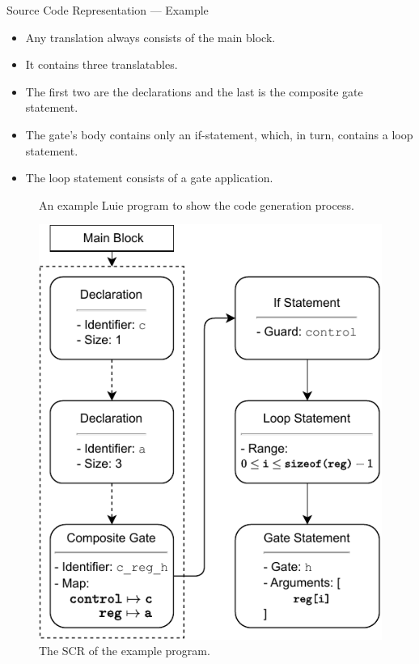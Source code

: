 \begin{frame}{Source Code Representation --- Example}
    \begin{minipage}{.60\textwidth}
        \begin{itemize}
            \item Any translation always consists of the main block.
            \item It contains three translatables.
            \item The first two are the declarations and the last is the composite gate statement.
            \item The gate's body contains only an if-statement, which, in turn, contains a loop statement.
            \item The loop statement consists of a gate application. 
        \end{itemize}   
        \vfill
        \begin{figure}
            \centering
            
            \caption{An example Luie program to show the code generation process.}
        \end{figure} 
    \end{minipage}
    \begin{minipage}{.35\textwidth}
        \centering
        \begin{figure}[htp]
            \centering
            \includegraphics[]{../figures/drawio/codeGen_sourceCode_example.pdf}
            \caption{The SCR of the example program.}
        \end{figure}
    \end{minipage}
\end{frame}

